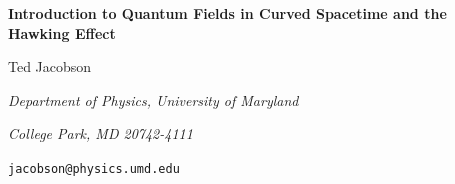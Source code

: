 \documentclass[12pt]{article}
\begin{document}
\baselineskip 16pt

\def\ad{a^\dagger}

\def\chibar{\bar{\chi}}
\def\G{\Gamma}
\def\L{\Lambda}
\def\oG{|\G|}
\def\Mg{M/\G}
\def\s3g{S^3/\G}
\def\fphi{\varphi}
\def\gsim{\; \raisebox{-.8ex}{$\stackrel{\textstyle >}{\sim}$}\;}
\def\lsim{\; \raisebox{-.8ex}{$\stackrel{\textstyle <}{\sim}$}\;}
\def\beq{\begin{equation}}
\def\eeq{\end{equation}}
\def\bq{\begin{quote}}
\def\eq{\end{quote}}
\def\bea{\begin{eqnarray}}
\def\eea{\end{eqnarray}}
\def\ben{\begin{enumerate}}
\def\een{\end{enumerate}}
\def\bit{\begin{itemize}}
\def\eit{\end{itemize}}
\def\({\left (}
\def\){\right )}
\def\[{\left [}
\def\]{\right ]}
\def\T{{\bf T}}

\def\fphi{\varphi}

\def\g{\gamma}
\def\a{\alpha}
\def\b{\beta}
\def\d{\delta}
\def\k{\kappa}
\def\l{\lambda}
\def\m{\mu}
\def\n{\nu}
\def\r{\rho}
\def\s{\sigma}
\def\o{\omega}
\def\O{\Omega}
\def\S{\Sigma}
\def\t{\tau}
\def\z{\zeta}
\def\D{\Delta }
\def\tphi{\tilde{\fphi}}
\def\ra{\rangle}
\def\la{\langle}
\def\p{\partial}
\def\bx{{\bf x}}
\def\bk{{\bf k}}
\def\bl{{\bf l}}
\def\kdx{\bk\cdot\bx}

\def\R{{\cal R}}
\def\W{{\cal W}}
\def\V{{\cal V}}

\def\half{\textstyle{\frac{1}{2}}}
\bigskip
\hspace*{\fill}
\bigskip\bigskip\bigskip

\begin{center}
\Large \bf Introduction to Quantum Fields in Curved Spacetime
and the Hawking Effect
\end{center}
\bigskip\bigskip\bigskip
\centerline{\large Ted Jacobson}
\medskip
\centerline{\it Department of Physics, University of Maryland}
\centerline{\it College Park, MD 20742-4111}
\centerline{\tt jacobson@physics.umd.edu}

\begin{abstract}
These notes  introduce
the subject of quantum field theory in curved spacetime
and some of its applications
and the questions they raise. Topics include particle creation
in time-dependent metrics, quantum origin of primordial
perturbations, Hawking effect, the trans-Planckian question, 
and Hawking radiation on a lattice.
\vskip 1cm
\begin{center}
{\it Based on 
lectures given at the  CECS School on Quantum Gravity 
in Valdivia, Chile, January 2002.}
\end{center}
\end{abstract}
\end{document}
